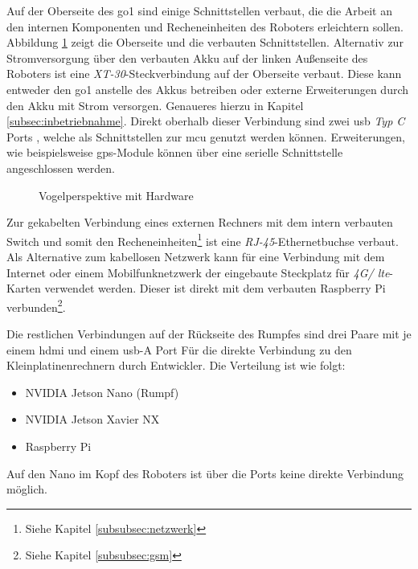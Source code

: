 Auf der Oberseite des \gls{go1} sind einige Schnittstellen verbaut, die die Arbeit an den internen Komponenten und
Recheneinheiten des Roboters erleichtern sollen.
Abbildung \ref{fig:vogelperspektive} zeigt die Oberseite und die verbauten Schnittstellen.
Alternativ zur Stromversorgung über den verbauten Akku  auf der linken Außenseite des Roboters ist eine
\emph{XT-30}-Steckverbindung  auf der Oberseite verbaut.
Diese kann entweder den \gls{go1} anstelle des Akkus betreiben oder externe Erweiterungen durch den Akku mit Strom versorgen.
Genaueres hierzu in Kapitel \ref{subsec:inbetriebnahme}.
Direkt oberhalb dieser Verbindung sind zwei \gls{usb} \emph{Typ C} Ports , welche als Schnittstellen zur \gls{mcu} genutzt werden können.
Erweiterungen, wie beispielsweise \gls{gps}-Module können über eine serielle Schnittstelle  angeschlossen werden.

\begin{figure}[h]
    \caption{Vogelperspektive mit Hardware}\label{fig:vogelperspektive}
\end{figure}

Zur gekabelten Verbindung eines externen Rechners mit dem intern verbauten Switch und somit den Recheneinheiten\footnote{Siehe Kapitel \ref{subsubsec:netzwerk}}
ist eine \emph{RJ-45}-Ethernetbuchse  verbaut.
Als Alternative zum kabellosen Netzwerk kann für eine Verbindung mit dem Internet oder einem Mobilfunknetzwerk der eingebaute
Steckplatz für \emph{4G/ \gls{lte}}-Karten  verwendet werden.
Dieser ist direkt mit dem verbauten Raspberry Pi verbunden\footnote{Siehe Kapitel \ref{subsubsec:gsm}}.

Die restlichen Verbindungen auf der Rückseite des Rumpfes sind drei Paare mit je einem \gls{hdmi} und einem \gls{usb}-A Port
Für die direkte Verbindung zu den Kleinplatinenrechnern durch Entwickler.
Die Verteilung ist wie folgt:

\begin{itemize}
    \item {} NVIDIA Jetson Nano (Rumpf)
    \item {} NVIDIA Jetson Xavier NX
    \item {} Raspberry Pi
\end{itemize}

Auf den Nano im Kopf des Roboters ist über die Ports keine direkte Verbindung möglich.




